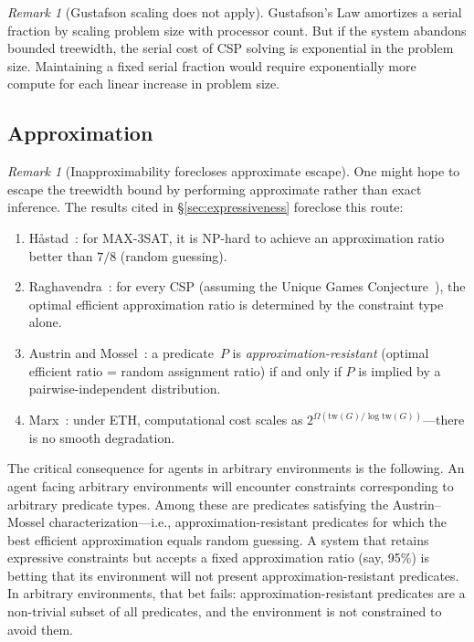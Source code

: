 \documentclass[11pt,a4paper]{article}
\theoremstyle{plain}
\theoremstyle{definition}
\theoremstyle{remark}
\newtheorem{remark}[theorem]{Remark}
\begin{document}
\begin{remark}[Gustafson scaling does not apply]\label{rem:gustafson}
Gustafson's Law amortizes a serial fraction by scaling problem size with processor count.
But if the system abandons bounded treewidth, the serial cost of CSP solving is exponential in the problem size.
Maintaining a fixed serial fraction would require exponentially more compute for each linear increase in problem size.
\end{remark}

\subsection{Approximation}\label{sec:approx}

\begin{remark}[Inapproximability forecloses approximate escape]\label{rem:inapprox}
One might hope to escape the treewidth bound by performing approximate rather than exact inference.
The results cited in \S\ref{sec:expressiveness} foreclose this route:
\begin{enumerate}[nosep,label=(\roman*)]
  \item H\aa stad~\cite{Hastad01}: for MAX-3SAT, it is NP-hard to achieve an approximation ratio better than $7/8$ (random guessing).
  \item Raghavendra~\cite{Raghavendra08}: for every CSP (assuming the Unique Games Conjecture~\cite{Khot02}), the optimal efficient approximation ratio is determined by the constraint type alone.
  \item Austrin and Mossel~\cite{AustrinMossel09}: a predicate~$P$ is \emph{approximation-resistant} (optimal efficient ratio = random assignment ratio) if and only if $P$ is implied by a pairwise-independent distribution.
  \item Marx~\cite{Marx10}: under ETH, computational cost scales as $2^{\Omega(\mathrm{tw}(G)/\log \mathrm{tw}(G))}$---there is no smooth degradation.
\end{enumerate}
The critical consequence for agents in arbitrary environments is the following.
An agent facing arbitrary environments will encounter constraints corresponding to arbitrary predicate types.
Among these are predicates satisfying the Austrin--Mossel characterization---i.e., approximation-resistant predicates for which the best efficient approximation equals random guessing.
A system that retains expressive constraints but accepts a fixed approximation ratio (say, 95\%) is betting that its environment will not present approximation-resistant predicates.
In arbitrary environments, that bet fails: approximation-resistant predicates are a non-trivial subset of all predicates, and the environment is not constrained to avoid them.


\end{remark}
\end{document}
